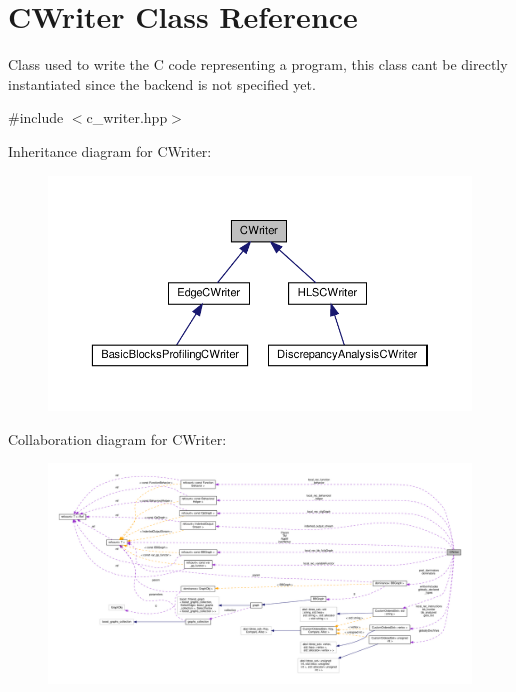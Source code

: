 \hypertarget{classCWriter}{}\section{C\+Writer Class Reference}
\label{classCWriter}


Class used to write the C code representing a program, this class can\textquotesingle{}t be directly instantiated since the backend is not specified yet.  




{\ttfamily \#include $<$c\+\_\+writer.\+hpp$>$}



Inheritance diagram for C\+Writer\+:
\nopagebreak
\begin{figure}[H]
\begin{center}
\leavevmode
\includegraphics[width=350pt]{d6/d07/classCWriter__inherit__graph}
\end{center}
\end{figure}


Collaboration diagram for C\+Writer\+:
\nopagebreak
\begin{figure}[H]
\begin{center}
\leavevmode
\includegraphics[width=350pt]{d4/dd9/classCWriter__coll__graph}
\end{center}
\end{figure}

